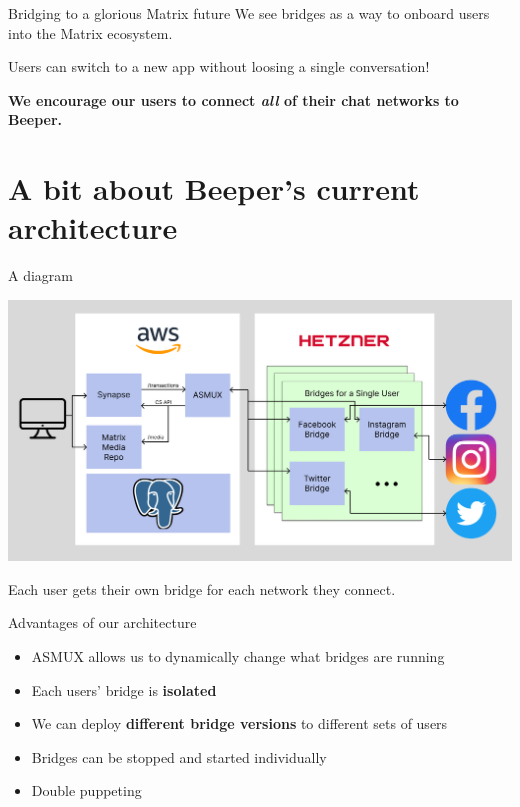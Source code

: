\documentclass{beeper}
\begin{document}
\begin{frame}{Bridging to a glorious Matrix future}
    We see bridges as a way to onboard users into the Matrix ecosystem.

    Users can switch to a new app without loosing a single conversation!
    \pause

    \vspace{1cm}
    \begin{center}
        \Large
        \textbf{We encourage our users to connect \textit{all} of their chat
        networks to Beeper.}
    \end{center}
\end{frame}

\section{A bit about Beeper's current architecture}

\begin{frame}{A diagram}
    \centerline{\includegraphics[width=1.15\textwidth]{images/current-architecture}}

    Each user gets their own bridge for each network they connect.
\end{frame}

\begin{frame}{Advantages of our architecture}
    \begin{itemize}[<+->]
        \item ASMUX allows us to dynamically change what bridges are running
        \item Each users' bridge is \textbf{isolated}
        \item We can deploy \textbf{different bridge versions} to different sets
            of users
        \item Bridges can be stopped and started individually
        \item Double puppeting
    \end{itemize}
\end{frame}
\end{document}
